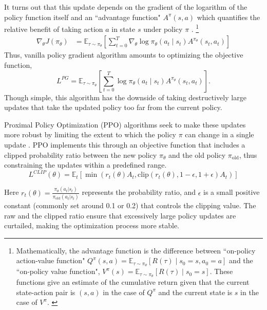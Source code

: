It turns out that this update depends on the gradient of the logarithm of the policy function itself and an ``advantage function" \( A^\pi (s, a) \) which quantifies the relative benefit of taking action \( a \) in state \( s \) under policy \( \pi \) \cite{SpinningUp2018}.
\footnote{
Mathematically, the advantage function is the difference between ``on-policy action-value function" $Q^{\pi}(s, a) = \mathbb{E}_{\tau \sim \pi_\theta} [R(\tau) \mid s_0 = s, a_0 = a]$ and the ``on-policy value function", $V^{\pi}(s) = \mathbb{E}_{\tau \sim \pi_\theta} [R(\tau) \mid s_0 = s]$. These functions give an estimate of the cumulative return given that the current state-action pair is $(s, a)$ in the case of $Q^\pi$ and the current state is $s$ in the case of $V^{\pi}$.
\label{ft:advantage}
}
\begin{align*}
	\nabla_\theta J(\pi_\theta) &= \mathbb{E}_{\tau \sim \pi_\theta} \left[ \sum\limits_{t=0}^T \nabla_\theta \log 								\pi_\theta (a_t \mid s_t) A^{\pi_\theta} (s_t, a_t) \right]
\end{align*}
Thus, vanilla policy gradient algorithm amounts to optimizing the objective function, 
\[
L^{PG} = \mathbb{E}_{\tau \sim \pi_\theta} \left[ \sum\limits_{t=0}^T \log 								\pi_\theta (a_t \mid s_t) A^{\pi_\theta} (s_t, a_t) \right].
\]
Though simple, this algorithm has the downside of taking destructively large updates that take the updated policy too far from the current policy.
\newline 

Proximal Policy Optimization (PPO) algorithms seek to make these updates more robust by limiting the extent to which the policy \( \pi \) can change in a single update \cite{schulman2017proximal}.
PPO implements this through an objective function that includes a clipped probability ratio between the new policy \( \pi_\theta \) and the old policy \( \pi_{\text{old}} \), thus constraining the updates within a predefined range. 
\[
L^{CLIP}(\theta) = \mathbb{E}_{t} \left[ \min(r_t(\theta) A_t, \text{clip}(r_t(\theta), 1 - \epsilon, 1 + \epsilon) A_t) \right]
\]

Here \( r_t(\theta) = \frac{\pi_\theta(a_t | s_t)}{\pi_{\text{old}}(a_t | s_t)} \) represents the probability ratio, and \( \epsilon \) is a small positive constant (commonly set around 0.1 or 0.2) that controls the clipping value. The raw and the clipped ratio ensure that excessively large policy updates are curtailed, making the optimization process more stable.
\newline 


